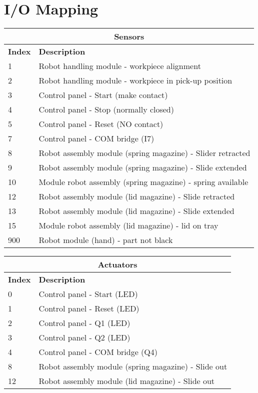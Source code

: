 \documentclass{article}
\begin{document}
\section{I/O Mapping}
\begin{center}
	\setlength\extrarowheight{4pt}
	\small
	\begin{tabularx}{\textwidth}{|p{1cm}|X|}
		\hline
		\multicolumn{2}{|c|}{\bf \color{black} \large Sensors}\\
		\hline\hline
		\bf Index & \bf Description\\
		\hline\hline
		1 & Robot handling module - workpiece alignment\\
		\hline
		2 & Robot handling module - workpiece in pick-up position\\
		\hline
		3 & Control panel - Start (make contact)\\
		\hline
		4 & Control panel - Stop (normally closed) \\
		\hline
		5 & Control panel - Reset (NO contact)\\
		\hline
		7 & Control panel - COM bridge (I7)\\
		\hline
		8 & Robot assembly module (spring magazine) - Slider retracted\\
		\hline
		9 & Robot assembly module (spring magazine) - Slide extended\\
		\hline
		10 & Module robot assembly (spring magazine) - spring available \\
		\hline
		12 & Robot assembly module (lid magazine) - Slide retracted\\
		\hline
		13 & Robot assembly module (lid magazine) - Slide extended\\
		\hline
		15 & Module robot assembly (lid magazine) - lid on tray\\
		\hline
		900 & Robot module (hand) - part not black\\
		\hline
	\end{tabularx}
\end{center}
\begin{center}
	\setlength\extrarowheight{4pt}
	\small
	\begin{tabularx}{\textwidth}{|p{1cm}|X|}
		\hline
		\multicolumn{2}{|c|}{\bf \color{black} \large Actuators}\\
		\hline\hline
		\bf Index & \bf Description\\
		\hline\hline
		0 & Control panel - Start (LED)\\
		\hline
		1 & Control panel - Reset (LED)\\
		\hline
		2 & Control panel - Q1 (LED)\\
		\hline
		3 & Control panel - Q2 (LED)\\
		\hline
		4 & Control panel - COM bridge (Q4)\\
		\hline
		8 & Robot assembly module (spring magazine) - Slide out\\
		\hline
		12 & Robot assembly module (lid magazine) - Slide out\\
		\hline
	\end{tabularx}
\end{center}
\end{document}
